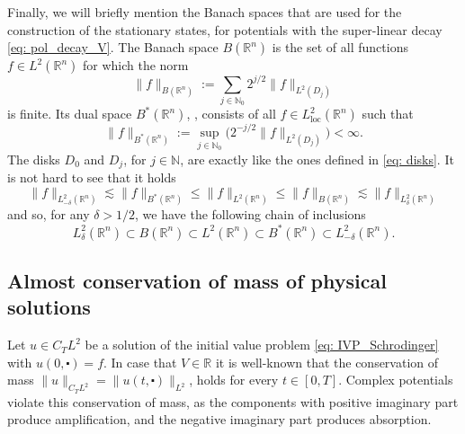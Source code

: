 \documentclass[10pt,a4paper]{amsart}
\theoremstyle{remark}
\theoremstyle{definition}
\newcommand{\R}{\mathbb{R}}
\def\loc{\mathop\mathrm{loc}}
\def\lec{\lesssim}
\def\cd{\centerdot}
\begin{document}
Finally, we will briefly mention the Banach spaces that are used for the construction of the stationary states, for potentials with the super-linear decay \eqref{eq: pol_decay_V}. The Banach space $B(\R^n)$ is the set of all functions 
$f\in L^2(\R^n)$ for which the norm
%
\[
\|f\|_{B(\R^n)} := \sum_{j\in \mathbb N_0} 2^{j/2}\|f\|_{L^2(D_j)}  
\]
%
is finite.
Its dual space $B^*(\R^n)$, \cite[\S 14.1]{HormII}, consists of all $f\in L^2_{\loc}(\R^n)$ such that 
%
\[
\|f\|_{B^*(\R^n)} := \sup_{j\in\mathbb N_0}\big( 2^{-j/2} \| f \|_{L^2(D_j)}\big) < \infty.
\]
%
The disks $D_0$ and $D_j$, for $j\in \mathbb N$, are exactly like the ones defined in \eqref{eq: disks}. 
%
It is not hard to see that it holds 
%
\begin{equation}\label{eq: bstarl2delta}
	\|f\|_{L^2_{-\delta}(\R^n)} \lec \|f\|_{B^*(\R^n)} \leq \|f\|_{L^2(\R^n)} \leq \|f\|_{B(\R^n)} \lec \|f\|_{L^2_\delta(\R^n)}
\end{equation}
%
and so, for any $\delta >1/2$, we have the following chain of inclusions
%
\[
 L^2_{\delta}(\R^n) \subset B(\R^n) \subset L^2(\R^n) \subset B^*(\R^n) \subset L^2_{-\delta}(\R^n).
\]
%




\subsection{Almost conservation of mass of physical solutions}
Let $u\in C_TL^2$ be a solution of the initial value problem \eqref{eq: IVP_Schrodinger} with $u(0,\cd)=f$. 
In case that $V\in \R$ it is well-known that the conservation of mass $\|u\|_{C_TL^2}= \|u(t, \cd)\|_{L^2}$, holds for every $t\in[0, T]$.  Complex potentials violate this conservation of mass, as the components with positive imaginary part produce amplification, and the negative imaginary part produces absorption. 
\end{document}
